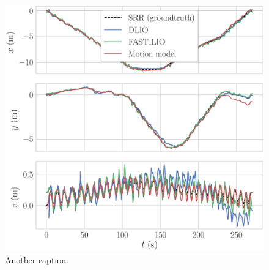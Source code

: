\begin{figure}
  \centering 
  \includegraphics[width=\linewidth]{img/trajectory_components}
  \caption{Another caption.}
\end{figure}

